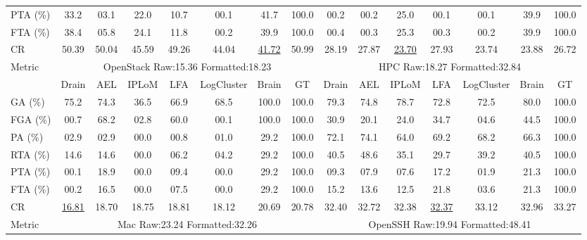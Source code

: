 \begin{table}[p]
\begin{adjustbox}{width=\textwidth,max totalheight=.86\textheight}
\begin{tabular}{l|ccccccc|ccccccc}
PTA (\%) & 33.2 & 03.1 & 22.0 & 10.7 & 00.1 & 41.7 & \cellcolor{lightgray}100.0 & 00.2 & 00.2 & 25.0 & 00.1 & 00.1 & 39.9 & \cellcolor{lightgray}100.0 \\
FTA (\%) & 38.4 & 05.8 & 24.1 & 11.8 & 00.2 & 39.9 & \cellcolor{lightgray}100.0 & 00.4 & 00.3 & 25.3 & 00.3 & 00.2 & 39.9 & \cellcolor{lightgray}100.0 \\
CR & 50.39 & 50.04 & 45.59 & 49.26 & 44.04 & \underline{41.72} & \cellcolor{lightgray}50.99 & \cellcolor{lightgray}28.19 & 27.87 & \underline{23.70} & 27.93 & 23.74 & 23.88 & 26.72 \\
\midrule
\multirow{2}{*}{Metric} & \multicolumn{7}{c}{OpenStack Raw:15.36 Formatted:18.23} & \multicolumn{7}{c}{HPC Raw:18.27 Formatted:32.84} \\
\cmidrule(lr){2-8} \cmidrule(lr){9-15}
& Drain & AEL & IPLoM & LFA & LogCluster & Brain & GT & Drain & AEL & IPLoM & LFA & LogCluster & Brain & GT \\
\midrule
GA (\%) & 75.2 & 74.3 & 36.5 & 66.9 & 68.5 & \cellcolor{lightgray}100.0 & \cellcolor{lightgray}100.0 & 79.3 & 74.8 & 78.7 & 72.8 & 72.5 & 80.0 & \cellcolor{lightgray}100.0 \\
FGA (\%) & 00.7 & 68.2 & 02.8 & 60.0 & 00.1 & \cellcolor{lightgray}100.0 & \cellcolor{lightgray}100.0 & 30.9 & 20.1 & 24.0 & 34.7 & 04.6 & 44.5 & \cellcolor{lightgray}100.0 \\
PA (\%) & 02.9 & 02.9 & 00.0 & 00.8 & 01.0 & 29.2 & \cellcolor{lightgray}100.0 & 72.1 & 74.1 & 64.0 & 69.2 & 68.2 & 66.3 & \cellcolor{lightgray}100.0 \\
RTA (\%) & 14.6 & 14.6 & 00.0 & 06.2 & 04.2 & 29.2 & \cellcolor{lightgray}100.0 & 40.5 & 48.6 & 35.1 & 29.7 & 39.2 & 40.5 & \cellcolor{lightgray}100.0 \\
PTA (\%) & 00.1 & 18.9 & 00.0 & 09.4 & 00.0 & 29.2 & \cellcolor{lightgray}100.0 & 09.3 & 07.9 & 07.6 & 17.2 & 01.9 & 21.3 & \cellcolor{lightgray}100.0 \\
FTA (\%) & 00.2 & 16.5 & 00.0 & 07.5 & 00.0 & 29.2 & \cellcolor{lightgray}100.0 & 15.2 & 13.6 & 12.5 & 21.8 & 03.6 & 21.3 & \cellcolor{lightgray}100.0 \\
CR & \underline{16.81} & 18.70 & 18.75 & 18.81 & 18.12 & 20.69 & \cellcolor{lightgray}20.78 & 32.40 & 32.72 & 32.38 & \underline{32.37} & 33.12 & 32.96 & \cellcolor{lightgray}33.27 \\
\midrule
\multirow{2}{*}{Metric} & \multicolumn{7}{c}{Mac Raw:23.24 Formatted:32.26} & \multicolumn{7}{c}{OpenSSH Raw:19.94 Formatted:48.41} \\

\end{tabular}
\end{adjustbox}
\end{table}
